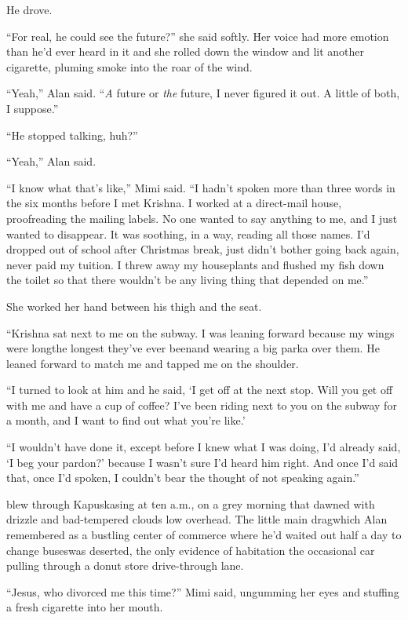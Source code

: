 He drove.

``For real, he could see the future?'' she said softly.  Her voice had
more emotion than he'd ever heard in it and she rolled down the window
and lit another cigarette, pluming smoke into the roar of the wind.

``Yeah,'' Alan said.  ``\textit{A} future or \textit{the} future, I
never figured it out.  A little of both, I suppose.''

``He stopped talking, huh?''

``Yeah,'' Alan said.

``I know what that's like,'' Mimi said.  ``I hadn't spoken more than
three words in the six months before I met Krishna.  I worked at a
direct-mail house, proofreading the mailing labels.  No one wanted to
say anything to me, and I just wanted to disappear.  It was soothing,
in a way, reading all those names.  I'd dropped out of school after
Christmas break, just didn't bother going back again, never paid my
tuition.  I threw away my houseplants and flushed my fish down the
toilet so that there wouldn't be any living thing that depended on
me.''

She worked her hand between his thigh and the seat.

``Krishna sat next to me on the subway.  I was leaning forward because
my wings were long\dash{}the longest they've ever been\dash{}and wearing a big
parka over them.  He leaned forward to match me and tapped me on the
shoulder.

``I turned to look at him and he said, `I get off at the next stop. 
Will you get off with me and have a cup of coffee?  I've been riding
next to you on the subway for a month, and I want to find out what
you're like.'

``I wouldn't have done it, except before I knew what I was doing, I'd
already said, `I beg your pardon?' because I wasn't sure I'd heard him
right.  And once I'd said that, once I'd spoken, I couldn't bear the
thought of not speaking again.''

 blew through Kapuskasing at ten a.m., on a grey morning that
dawned with drizzle and bad-tempered clouds low overhead.  The little
main drag\dash{}which Alan remembered as a bustling center of commerce
where he'd waited out half a day to change buses\dash{}was deserted, the
only evidence of habitation the occasional car pulling through a donut
store drive-through lane.

``Jesus, who divorced me this time?'' Mimi said, ungumming her eyes
and stuffing a fresh cigarette into her mouth.

